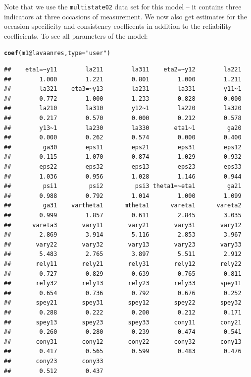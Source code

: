 \documentclass[10pt]{article}\usepackage{graphicx, color}
\makeatletter
\newcommand{\hlfunctioncall}[1]{\textcolor[rgb]{0.501960784313725,0,0.329411764705882}{\textbf{#1}}}%
\newcommand{\hlstring}[1]{\textcolor[rgb]{0.6,0.6,1}{#1}}%
\newenvironment{kframe}{%
 \def\at@end@of@kframe{}%
 \ifinner\ifhmode%
  \def\at@end@of@kframe{\end{minipage}}%
  \begin{minipage}{\columnwidth}%
 \fi\fi%
 \def\FrameCommand##1{\hskip\@totalleftmargin \hskip-\fboxsep
 \colorbox{shadecolor}{##1}\hskip-\fboxsep
     \hskip-\linewidth \hskip-\@totalleftmargin \hskip\columnwidth}%
 \MakeFramed {\advance\hsize-\width
   \@totalleftmargin\z@ \linewidth\hsize
   \@setminipage}}%
 {\par\unskip\endMakeFramed%
 \at@end@of@kframe}
\newenvironment{knitrout}{}{} %
\makeatother
\begin{document}
%
Note that we use the \texttt{multistate02} data set for this model -- it contains three indicators at three occasions of measurement. We now also get estimates for the occasion specificity and consistency coefficents in addition to the reliability coefficients. To see all parameters of the model:
%
\begin{knitrout}
\color{fgcolor}\begin{kframe}
\begin{alltt}
\hlfunctioncall{coef}(m1@lavaanres, type = \hlstring{"user"})
\end{alltt}
\begin{verbatim}
##    eta1=~y11        la211        la311    eta2=~y12        la221 
##        1.000        1.221        0.801        1.000        1.211 
##        la321    eta3=~y13        la231        la331        y11~1 
##        0.772        1.000        1.233        0.828        0.000 
##        la210        la310        y12~1        la220        la320 
##        0.217        0.570        0.000        0.212        0.578 
##        y13~1        la230        la330       eta1~1         ga20 
##        0.000        0.262        0.574        0.000        0.400 
##         ga30        eps11        eps21        eps31        eps12 
##       -0.115        1.070        0.874        1.029        0.932 
##        eps22        eps32        eps13        eps23        eps33 
##        1.036        0.956        1.028        1.146        0.944 
##         psi1         psi2         psi3 theta1=~eta1         ga21 
##        0.988        0.792        1.014        1.000        1.099 
##         ga31    vartheta1      mtheta1      vareta1      vareta2 
##        0.999        1.857        0.611        2.845        3.035 
##      vareta3       vary11       vary21       vary31       vary12 
##        2.869        3.914        5.116        2.853        3.967 
##       vary22       vary32       vary13       vary23       vary33 
##        5.483        2.765        3.897        5.511        2.912 
##       rely11       rely21       rely31       rely12       rely22 
##        0.727        0.829        0.639        0.765        0.811 
##       rely32       rely13       rely23       rely33       spey11 
##        0.654        0.736        0.792        0.676        0.252 
##       spey21       spey31       spey12       spey22       spey32 
##        0.288        0.222        0.200        0.212        0.171 
##       spey13       spey23       spey33       cony11       cony21 
##        0.260        0.280        0.239        0.474        0.541 
##       cony31       cony12       cony22       cony32       cony13 
##        0.417        0.565        0.599        0.483        0.476 
##       cony23       cony33 
##        0.512        0.437
\end{verbatim}
\end{kframe}
\end{knitrout}
\end{document}
